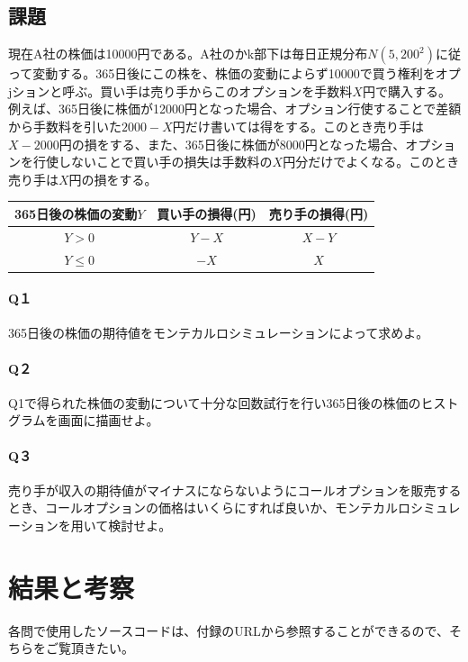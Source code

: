 \documentclass[dvipdfmx]{jsarticle}
\begin{document}
\subsection{課題}
現在A社の株価は10000円である。A社のかk部下は毎日正規分布$N(5, 200^{2})$に従って変動する。365日後にこの株を、株価の変動によらず10000で買う権利をオプjションと呼ぶ。買い手は売り手からこのオプションを手数料$X$円で購入する。例えば、365日後に株価が12000円となった場合、オプション行使することで差額から手数料を引いた$2000-X$円だけ書いては得をする。このとき売り手は$X-2000$円の損をする、また、365日後に株価が8000円となった場合、オプションを行使しないことで買い手の損失は手数料の$X$円分だけでよくなる。このとき売り手は$X$円の損をする。
\begin{table}[H]
  \begin{center}
    \begin{tabular}{|c|c|c|} \hline
      365日後の株価の変動$Y$ & 買い手の損得(円) & 売り手の損得(円) \\ \hline
      $Y > 0$ & $Y - X$ & $X - Y$ \\
      $Y \leq 0$ & $-X$ & $X$ \\ \hline
    \end{tabular}
    \label{hyo02}
  \end{center}
\end{table}
\paragraph{Q１}365日後の株価の期待値をモンテカルロシミュレーションによって求めよ。
\paragraph{Q２}Q1で得られた株価の変動について十分な回数試行を行い365日後の株価のヒストグラムを画面に描画せよ。
\paragraph{Q３}売り手が収入の期待値がマイナスにならないようにコールオプションを販売するとき、コールオプションの価格はいくらにすれば良いか、モンテカルロシミュレーションを用いて検討せよ。
\section{結果と考察}
各問で使用したソースコードは、付録のURLから参照することができるので、そちらをご覧頂きたい。
\end{document}
